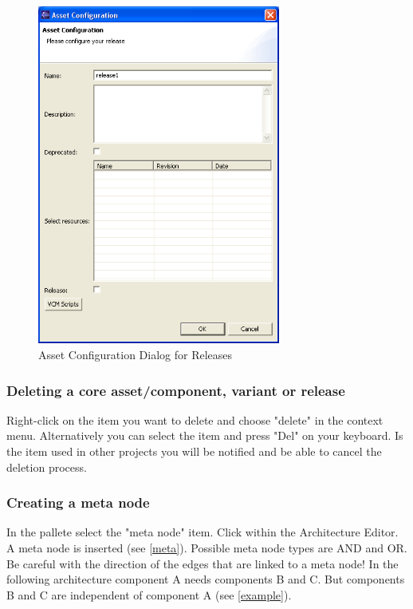 \begin{figure}[h!]
\begin{center}
\includegraphics[width=8cm]{configrel.png}
   \caption{Asset Configuration Dialog for Releases}
\label{configrel}
\end{center}
\end{figure}\par


\subsubsection{Deleting a core asset/component, variant or release}

Right-click on the item you want to delete and choose "delete" in the context
menu. Alternatively you
can select the item and press "Del" on your keyboard. Is the item used in other projects
you will be notified and be able to cancel the deletion process.


\subsubsection{Creating a meta node}

In the pallete select the "meta node" item. Click within the Architecture Editor. 
A meta node is inserted (see \ref{meta}). Possible meta node types are AND and OR. Be careful with
the direction of the edges that are linked to a meta node! In the following architecture component A
needs components B and C. But components B and C are independent of component A (see \ref{example}).

